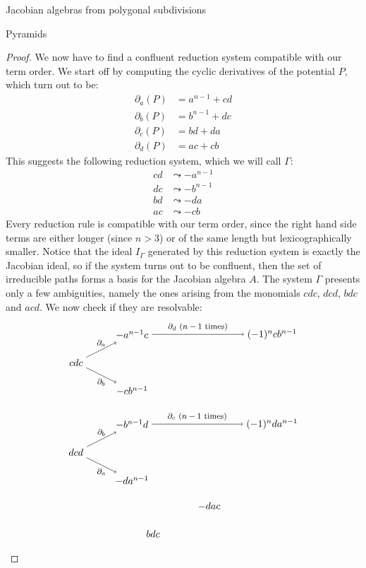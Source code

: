 \begin{chapter}{Jacobian algebras from polygonal subdivisions}
\begin{section}{Pyramids}
\begin{proof}
We now have to find a confluent reduction system compatible with our term order. We start off by computing the cyclic derivatives of the potential $P$, which turn out to be:
\begin{align*}
\partial_a(P) &= a^{n-1} + cd\\
\partial_b(P) &= b^{n-1} + dc\\
\partial_c(P) &= bd + da\\
\partial_d(P) &= ac + cb
\end{align*}
This suggests the following reduction system, which we will call $\Gamma$:
\begin{align*}
cd &\leadsto -a^{n-1}\tag{$\partial_a$}\\
dc &\leadsto -b^{n-1}\tag{$\partial_b$}\\
bd &\leadsto -da\tag{$\partial_c$}\\
ac &\leadsto -cb\tag{$\partial_d$}
\end{align*}
Every reduction rule is compatible with our term order, since the right hand side terms are either longer (since $n>3$) or of the same length but lexicographically smaller. Notice that the ideal $I_\Gamma$ generated by this reduction system is exactly the Jacobian ideal, so if the system turns out to be confluent, then the set of irreducible paths forms a basis for the Jacobian algebra $A$. The system $\Gamma$ presents only a few ambiguities, namely the ones arising from the monomials $cdc$, $dcd$, $bdc$ and $acd$. We now check if they are resolvable:
\[
\begin{tikzpicture}
\node (1) at (0,0) {$cdc$};
\node (a2) at (2,1) {$-a^{n-1}c$};
\node (b2) at (2,-1) {$-cb^{n-1}$};
\node (a3) at (7,1) {$(-1)^n cb^{n-1}$};
\draw[->] (1) to node[above, font=\footnotesize]{$\partial_a$} (a2);
\draw[->] (1) to node[below, font=\footnotesize]{$\partial_b$} (b2);
\draw[->] (a2) to node[above, font=\footnotesize]{$\partial_d$ ($n-1$ times)} (a3);
\end{tikzpicture}
\]
\[
\begin{tikzpicture}
\node (1) at (0,0) {$dcd$};
\node (a2) at (2,1) {$-b^{n-1}d$};
\node (b2) at (2,-1) {$-da^{n-1}$};
\node (a3) at (7,1) {$(-1)^n da^{n-1}$};
\draw[->] (1) to node[above, font=\footnotesize]{$\partial_b$} (a2);
\draw[->] (1) to node[below, font=\footnotesize]{$\partial_a$} (b2);
\draw[->] (a2) to node[above, font=\footnotesize]{$\partial_c$ ($n-1$ times)} (a3);
\end{tikzpicture}
\]
\[
\begin{tikzpicture}
\node (1) at (0,0) {$bdc$};
\node (a2) at (2,1) {$-dac$};

\end{tikzpicture}\]
\end{proof}
\end{section}
\end{chapter}
